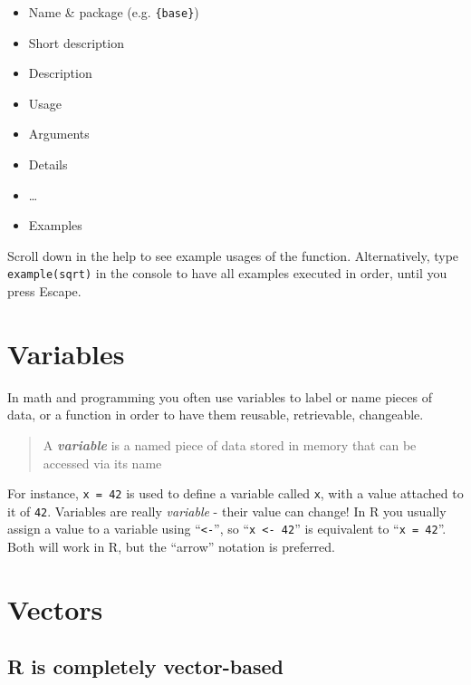 \documentclass[]{book}
\providecommand{\tightlist}{%
  \setlength{\itemsep}{0pt}\setlength{\parskip}{0pt}}
\begin{document}
\begin{itemize}
\tightlist
\item
  Name \& package (e.g. \texttt{\{base\}})
\item
  Short description
\item
  Description
\item
  Usage
\item
  Arguments
\item
  Details
\item
  \ldots{}
\item
  Examples
\end{itemize}

Scroll down in the help to see example usages of the function. Alternatively, type \texttt{example(sqrt)} in the console to have all examples executed in order, until you press Escape.

\hypertarget{variables}{%
\section{Variables}\label{variables}}

In math and programming you often use variables to label or name pieces of data, or a function in order to have them reusable, retrievable, changeable.

\begin{quote}
A \textbf{\emph{variable}} is a named piece of data stored in memory that can be accessed via its name
\end{quote}

For instance, \texttt{x\ =\ 42} is used to define a variable called \texttt{x}, with a value attached to it of \texttt{42}. Variables are really \emph{variable} - their value can change!
In R you usually assign a value to a variable using ``\texttt{\textless{}-}'', so ``\texttt{x\ \textless{}-\ 42}'' is equivalent to ``\texttt{x\ =\ 42}''. Both will work in R, but the ``arrow'' notation is preferred.

\hypertarget{vectors}{%
\section{Vectors}\label{vectors}}

\hypertarget{r-is-completely-vector-based}{%
\subsection{R is completely vector-based}\label{r-is-completely-vector-based}}
\end{document}
